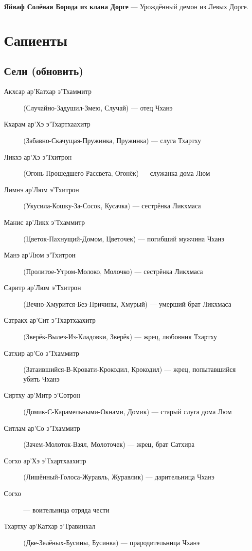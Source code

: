 \documentclass[a4paper,12pt,fleqn]{book}\usepackage{cooltooltips}\usepackage{polyglossia}\setdefaultlanguage[babelshorthands=true]{russian}\setotherlanguage{english}\defaultfontfeatures{Ligatures=TeX,Mapping=tex-text} \usepackage{xcolor}\definecolor{lightgray}{HTML}{bbbbbb}\color{lightgray}\newcommand{\ml}[3]{\textenglish{\textcolor{black}{#3}}}
\newcommand{\theterm}[3]{\textbf{\hypertarget{#1}{#2}} --- #3}
\begin{document}
{\theterm{jaivaf}
{Яйваф Солёная Борода из клана Дорге}
{Урождённый демон из Левых Дорге.}

\section{Сапиенты}

\subsection{Сели (обновить)}

\begin{description}

\item[Акхсар ар’Катхар э’Тхаммитр] (Случайно-Задушил-Змею, Случай) --- отец Чханэ

\item[Кхарам ар’Хэ э’Тхартхаахитр] (Забавно-Скачущая-Пружинка, Пружинка) --- слуга Тхартху

\item[Ликхэ ар’Хэ э’Тхитрон] (Огонь-Прошедшего-Рассвета, Огонёк) --- служанка дома Люм
\item[Лимнэ ар’Люм э’Тхитрон] (Укусила-Кошку-За-Сосок, Кусачка) --- сестрёнка Ликхмаса
\item[Манис ар’Ликх э’Тхаммитр] (Цветок-Пахнущий-Домом, Цветочек) --- погибший мужчина Чханэ

\item[Манэ ар’Люм э’Тхитрон] (Пролитое-Утром-Молоко, Молочко) --- сестрёнка Ликхмаса

\item[Саритр ар’Люм э’Тхитрон] (Вечно-Хмурится-Без-Причины, Хмурый) --- умерший брат Ликхмаса
\item[Сатракх ар’Сит э’Тхартхаахитр] (Зверёк-Вылез-Из-Кладовки, Зверёк) --- жрец, любовник Тхартху
\item[Сатхир ар’Со э’Тхаммитр] (Затаившийся-В-Кровати-Крокодил, Крокодил) --- жрец, попытавшийся убить Чханэ
\item[Сиртху ар’Митр э’Сотрон] (Домик-С-Карамельными-Окнами, Домик) --- старый слуга дома Люм
\item[Ситлам ар’Со э’Тхаммитр] (Зачем-Молоток-Взял, Молоточек) --- жрец, брат Сатхира

\item[Согхо ар’Хэ э’Тхартхаахитр] (Лишённый-Голоса-Журавль, Журавлик) --- дарительница Чханэ
\item[Согхо] --- воительница отряда чести


\item[Тхартху ар’Катхар э’Травинхал] (Две-Зелёных-Бусины, Бусинка) --- прародительница Чханэ



\end{description}}
\end{document}

